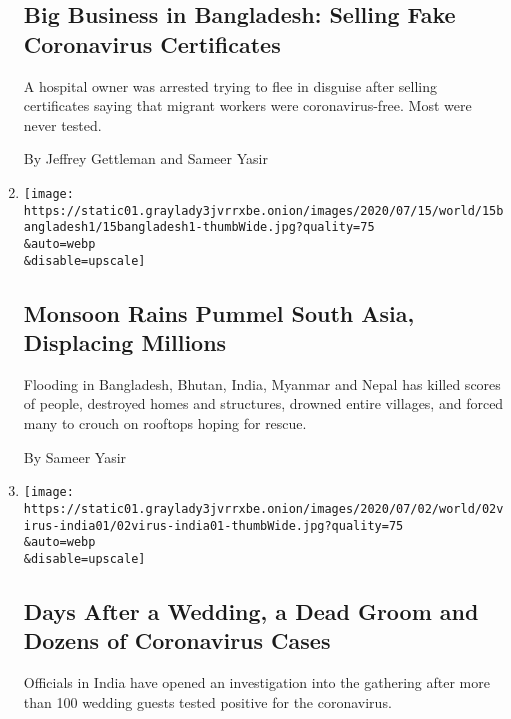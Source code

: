\begin{enumerate}
  \hypertarget{big-business-in-bangladesh-selling-fake-coronavirus-certificates}{%
  \subsection{Big Business in Bangladesh: Selling Fake Coronavirus
  Certificates}\label{big-business-in-bangladesh-selling-fake-coronavirus-certificates}}

  A hospital owner was arrested trying to flee in disguise after selling
  certificates saying that migrant workers were coronavirus-free. Most
  were never tested.

  By Jeffrey Gettleman and Sameer Yasir
\item
  \href{/2020/07/15/world/asia/monsoon-asia-bangladesh-india.html}{}

  \texttt{[image: https://static01.graylady3jvrrxbe.onion/images/2020/07/15/world/15bangladesh1/15bangladesh1-thumbWide.jpg?quality=75\\\&auto=webp\\\&disable=upscale]}

  \hypertarget{monsoon-rains-pummel-south-asia-displacing-millions}{%
  \subsection{Monsoon Rains Pummel South Asia, Displacing
  Millions}\label{monsoon-rains-pummel-south-asia-displacing-millions}}

  Flooding in Bangladesh, Bhutan, India, Myanmar and Nepal has killed
  scores of people, destroyed homes and structures, drowned entire
  villages, and forced many to crouch on rooftops hoping for rescue.

  By Sameer Yasir
\item
  \href{/2020/07/02/world/asia/india-coronavirus-wedding-groom.html}{}

  \texttt{[image: https://static01.graylady3jvrrxbe.onion/images/2020/07/02/world/02virus-india01/02virus-india01-thumbWide.jpg?quality=75\\\&auto=webp\\\&disable=upscale]}

  \hypertarget{days-after-a-wedding-a-dead-groom-and-dozens-of-coronavirus-cases}{%
  \subsection{Days After a Wedding, a Dead Groom and Dozens of
  Coronavirus
  Cases}\label{days-after-a-wedding-a-dead-groom-and-dozens-of-coronavirus-cases}}

  Officials in India have opened an investigation into the gathering
  after more than 100 wedding guests tested positive for the
  coronavirus.


\end{enumerate}
